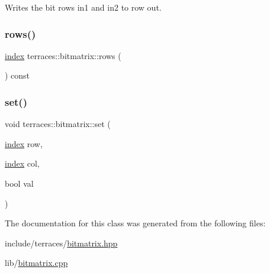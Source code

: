 Writes the bit rows \textquotesingle{}in1\textquotesingle{} and \textquotesingle{}in2\textquotesingle{} to row \textquotesingle{}out\textquotesingle{}. \mbox{\label{classterraces_1_1bitmatrix_a7e19b0df5f60d1bd76cda27987bac1ad}} 
\subsubsection{\texorpdfstring{rows()}{rows()}}
{\footnotesize\ttfamily \hyperlink{namespaceterraces_adbc33ccb543d1634e96d0eb02e472c77}{index} terraces\+::bitmatrix\+::rows (\begin{DoxyParamCaption}{ }\end{DoxyParamCaption}) const}

\mbox{\label{classterraces_1_1bitmatrix_abced1ac3b008ea34b2917e5a4b82a7d4}} 
\subsubsection{\texorpdfstring{set()}{set()}}
{\footnotesize\ttfamily void terraces\+::bitmatrix\+::set (\begin{DoxyParamCaption}\item[{\hyperlink{namespaceterraces_adbc33ccb543d1634e96d0eb02e472c77}{index}}]{row,  }\item[{\hyperlink{namespaceterraces_adbc33ccb543d1634e96d0eb02e472c77}{index}}]{col,  }\item[{bool}]{val }\end{DoxyParamCaption})}



The documentation for this class was generated from the following files\+:\begin{DoxyCompactItemize}
\item 
include/terraces/\hyperlink{bitmatrix_8hpp}{bitmatrix.\+hpp}\item 
lib/\hyperlink{lib_2bitmatrix_8cpp}{bitmatrix.\+cpp}\end{DoxyCompactItemize}
